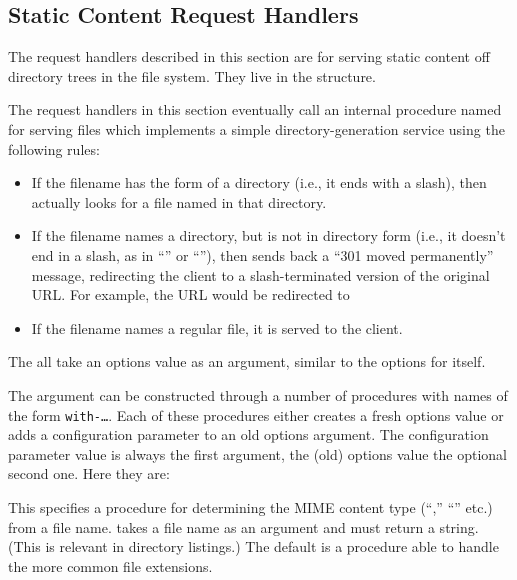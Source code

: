 \subsection{Static Content Request Handlers}

The request handlers described in this section are for serving static
content off directory trees in the file system.  They live in the
 structure.

The request handlers in this section eventually call an internal
procedure named  for serving files which implements a
simple directory-generation service using the following rules:
\begin{itemize}
\item If the filename has the form of a directory (i.e., it ends with
  a slash), then  actually looks for a file named
   in that directory.
\item If the filename names a directory, but is not in directory form
  (i.e., it doesn't end in a slash, as in
  ``'' or ``''),
  then  sends back a ``301 moved permanently''
  message, redirecting the client to a slash-terminated version of the
  original URL. For example, the URL
  would be redirected to
\item If the filename names a regular file, it is served to the
  client.
\end{itemize}
%
The  all take an options value as an
argument, similar to the options for  itself.

The  argument can be constructed through a number of procedures
with names of the form \texttt{with-\ldots}.  Each of these procedures
either creates a fresh options value or adds a configuration parameter
to an old options argument.  The configuration parameter value is
always the first argument, the (old) options value the optional second
one.  Here they are:

\begin{desc}
  This specifies a procedure for determining the MIME content type
  (``,'' ``'' etc.)
  from a file name.   takes a file name as an argument and
  must return a string.  (This is relevant in directory listings.)  The default is a procedure able to handle the
  more common file extensions.
\end{desc}

